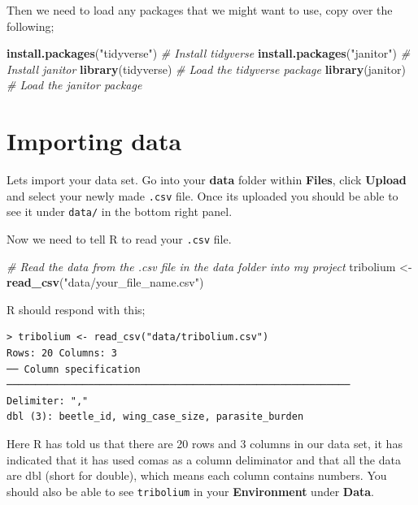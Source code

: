 \documentclass[
]{book}
\newenvironment{Shaded}{\begin{snugshade}}{\end{snugshade}}
\newcommand{\CommentTok}[1]{\textcolor[rgb]{0.56,0.35,0.01}{\textit{#1}}}
\newcommand{\FunctionTok}[1]{\textcolor[rgb]{0.13,0.29,0.53}{\textbf{#1}}}
\newcommand{\NormalTok}[1]{#1}
\newcommand{\OtherTok}[1]{\textcolor[rgb]{0.56,0.35,0.01}{#1}}
\newcommand{\StringTok}[1]{\textcolor[rgb]{0.31,0.60,0.02}{#1}}
\begin{document}
Then we need to load any packages that we might want to use, copy over the following;

\begin{Shaded}
\begin{Highlighting}[]
\FunctionTok{install.packages}\NormalTok{(}\StringTok{"tidyverse"}\NormalTok{) }\CommentTok{\# Install tidyverse}
\FunctionTok{install.packages}\NormalTok{(}\StringTok{"janitor"}\NormalTok{) }\CommentTok{\# Install janitor}
\FunctionTok{library}\NormalTok{(tidyverse) }\CommentTok{\# Load the tidyverse package}
\FunctionTok{library}\NormalTok{(janitor) }\CommentTok{\# Load the janitor package}
\end{Highlighting}
\end{Shaded}

\hypertarget{importing}{%
\section{Importing data}\label{importing}}

Lets import your data set. Go into your \textbf{data} folder within \textbf{Files}, click \textbf{Upload} and select your newly made \texttt{.csv} file. Once its uploaded you should be able to see it under \texttt{data/} in the bottom right panel.

Now we need to tell R to read your \texttt{.csv} file.

\begin{Shaded}
\begin{Highlighting}[]
\CommentTok{\# Read the data from the .csv file in the data folder into my project}
\NormalTok{tribolium }\OtherTok{\textless{}{-}} \FunctionTok{read\_csv}\NormalTok{(}\StringTok{"data/your\_file\_name.csv"}\NormalTok{) }
\end{Highlighting}
\end{Shaded}

R should respond with this;

\begin{verbatim}
> tribolium <- read_csv("data/tribolium.csv")
Rows: 20 Columns: 3                                                              
── Column specification ───────────────────────────────────────────────────────────
Delimiter: ","
dbl (3): beetle_id, wing_case_size, parasite_burden
\end{verbatim}

Here R has told us that there are 20 rows and 3 columns in our data set, it has indicated that it has used comas as a column deliminator and that all the data are dbl (short for double), which means each column contains numbers. You should also be able to see \texttt{tribolium} in your \textbf{Environment} under \textbf{Data}.
\end{document}
